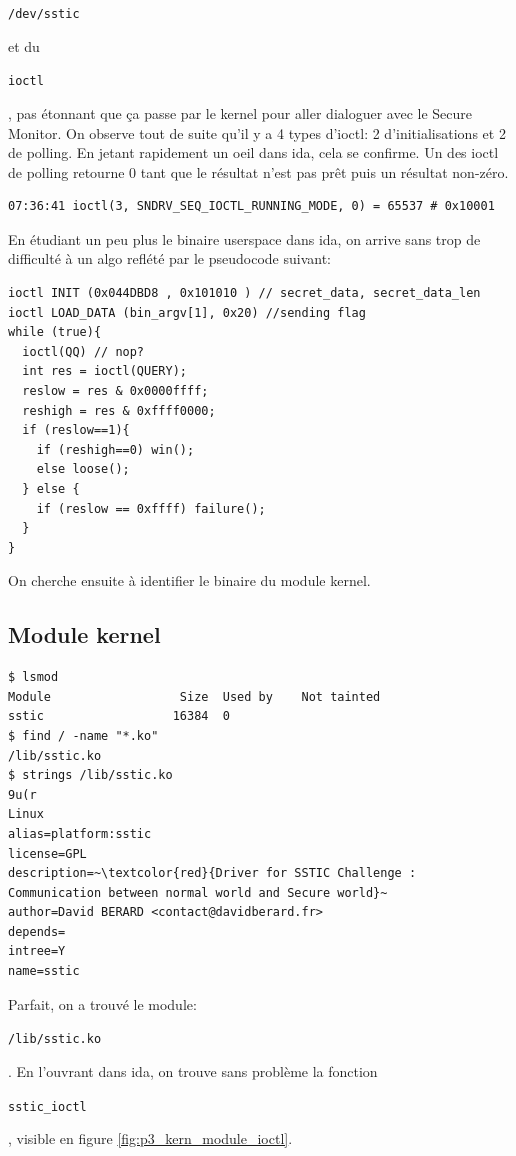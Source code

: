 \documentclass[14pt]{article}
\newcommand{\inlinebox}[2]{%
\colorbox{bg}{%
\parbox[b][0.6em]{\widthof{\texttt{#2}}}{\texttt{#2}}
}
}
\newcommand{\inlinebash}[1]{ \inlinebox{bash}{#1} }
\newcommand{\inlinec}[1]{ \inlinebox{c}{#1} }
\newcommand{\filename}[1]{ \inlinebox{bash}{#1} }
\theoremstyle{definition}
\begin{document}
\filename{/dev/sstic} et du \inlinec{ioctl}, pas étonnant que ça passe par le kernel pour aller dialoguer avec le Secure Monitor.
On observe tout de suite qu'il y a 4 types d'ioctl: 2 d'initialisations et 2 de polling. En jetant rapidement un oeil dans ida, cela se confirme.
Un des ioctl de polling retourne 0 tant que le résultat n'est pas prêt puis un résultat non-zéro.
\begin{verbatim}
07:36:41 ioctl(3, SNDRV_SEQ_IOCTL_RUNNING_MODE, 0) = 65537 # 0x10001
\end{verbatim}


En étudiant un peu plus le binaire userspace dans ida, on arrive sans trop de difficulté à un algo reflété par le pseudocode suivant:

\begin{verbatim}
ioctl INIT (0x044DBD8 , 0x101010 ) // secret_data, secret_data_len
ioctl LOAD_DATA (bin_argv[1], 0x20) //sending flag
while (true){
  ioctl(QQ) // nop?
  int res = ioctl(QUERY);
  reslow = res & 0x0000ffff;
  reshigh = res & 0xffff0000;
  if (reslow==1){
    if (reshigh==0) win();
    else loose();
  } else {
    if (reslow == 0xffff) failure();
  }
}
\end{verbatim}

On cherche ensuite à identifier le binaire du module kernel.
\subsection{Module kernel}
\begin{tcolorbox}
\begin{lstlisting}[escapechar=~]
$ lsmod
Module                  Size  Used by    Not tainted
sstic                  16384  0
$ find / -name "*.ko"
/lib/sstic.ko
$ strings /lib/sstic.ko
9u(r
Linux
alias=platform:sstic
license=GPL
description=~\textcolor{red}{Driver for SSTIC Challenge : Communication between normal world and Secure world}~
author=David BERARD <contact@davidberard.fr>
depends=
intree=Y
name=sstic
\end{lstlisting}
\end{tcolorbox}

Parfait, on a trouvé le module: \inlinebash{/lib/sstic.ko}. En l'ouvrant dans ida, on trouve sans problème la fonction \inlinec{sstic_ioctl}, visible en figure \ref{fig:p3_kern_module_ioctl}.
\end{document}

